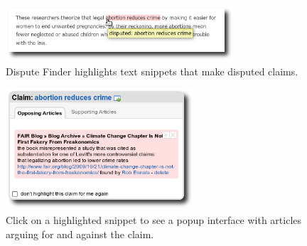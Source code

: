 \documentclass{www2010-submission}
\newcommand{\todo}[1]{}
\begin{document}


\begin{figure}[tb]
	\begin{center}
	\includegraphics[width=8.5cm]{pictures/highlight_abortion.png}
	\caption{Dispute Finder highlights text snippets that make disputed claims.}
	\label{highlight}
	\end{center}
\end{figure}

\begin{figure}[tb]
	\begin{center}
	\includegraphics[width=7cm]{pictures/popup_abortion_shadow.png}
	\caption{Click on a highlighted snippet to see a popup interface with articles arguing for and against the claim.}
	\label{claimview}
	\end{center}
\end{figure}
\todo{Popup interface should contain a ``don't mark this'' button}

\todo{More screenshots/graphs/visual information}

\todo{word this better}\todo{update all screenshots}

\end{document}
